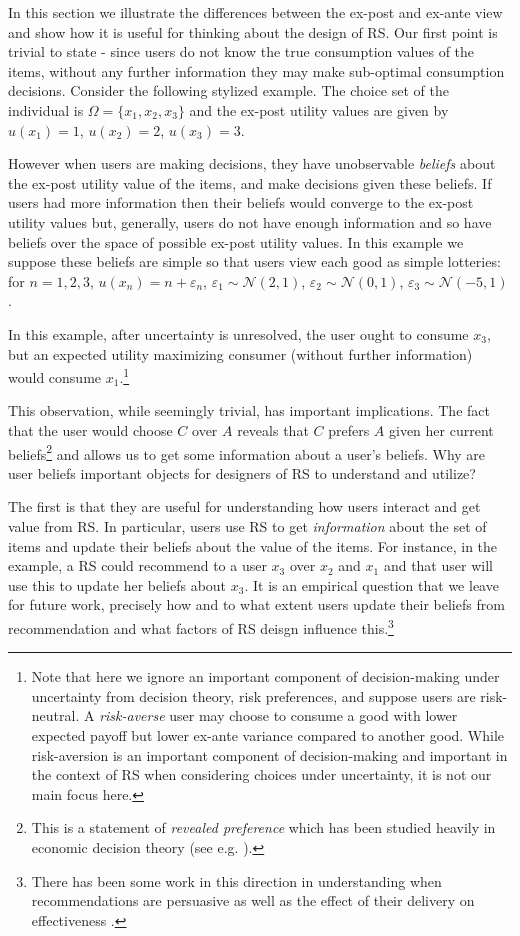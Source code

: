 \documentclass[sigconf]{acmart}
\begin{document}
In this section we illustrate the differences between the ex-post and ex-ante view and show how it is useful for thinking about the design of RS. Our first point is trivial to state - since users do not know the true consumption values of the items, without any further information they may make sub-optimal consumption decisions. Consider the following stylized example. The choice set of the individual is $\Omega= \{x_1, x_2, x_3 \}$ and the ex-post utility values are given by
$u(x_1) = 1$, $u(x_2) = 2$, $u(x_3) = 3$. 
\par
However when users are making decisions, they have unobservable \textit{beliefs} about the ex-post utility value of the items, and make decisions given these beliefs. If users had more information then their beliefs would converge to the ex-post utility values but, generally, users do not have enough information and so have beliefs over the space of possible ex-post utility values. In this example we suppose these beliefs are simple so that users view each good as simple lotteries: for $n=1,2,3$, $u(x_n) = n + \varepsilon_n$, $\varepsilon_1 \sim \mathcal N (2, 1)$, $\varepsilon_2 \sim \mathcal N (0, 1)$, $\varepsilon_3 \sim \mathcal N (-5, 1)$.
\par
In this example, after uncertainty is unresolved, the user ought to consume $x_3$, but an expected utility maximizing consumer (without further information) would consume $x_1$.\footnote{Note that here we ignore an important component of decision-making under uncertainty from decision theory, risk preferences, and suppose users are risk-neutral. A \textit{risk-averse} user may choose to consume a good with lower expected payoff but lower ex-ante variance compared to another good. While risk-aversion is an important component of decision-making and important in the context of RS when considering choices under uncertainty, it is not our main focus here.}
\par
This observation, while seemingly trivial, has important implications. The fact that the user would choose $C$ over $A$ reveals that $C$ prefers $A$ given her current beliefs\footnote{This is a statement of \textit{revealed preference} which has been studied heavily in economic decision theory (see e.g. \cite[]{mas1995microeconomic}).} and allows us to get some information about a user's beliefs. Why are user beliefs important objects for designers of RS to understand and utilize?
\par
The first is that they are useful for understanding how users interact and get value from RS. In particular, users use RS to get \textit{information} about the set of items and update their beliefs about the value of the items. For instance, in the example, a RS could recommend to a user $x_3$ over $x_2$ and $x_1$ and that user will use this to update her beliefs about $x_3$. It is an empirical question that we leave for future work, precisely how and to what extent users update their beliefs from recommendation and what factors of RS deisgn influence this.\footnote{There has been some work in this direction in understanding when recommendations are persuasive \cite{cremonesi2012investigating, gretzel2006persuasion} as well as the effect of their delivery on effectiveness \cite{murphy2014recommendation}.}
\end{document}
